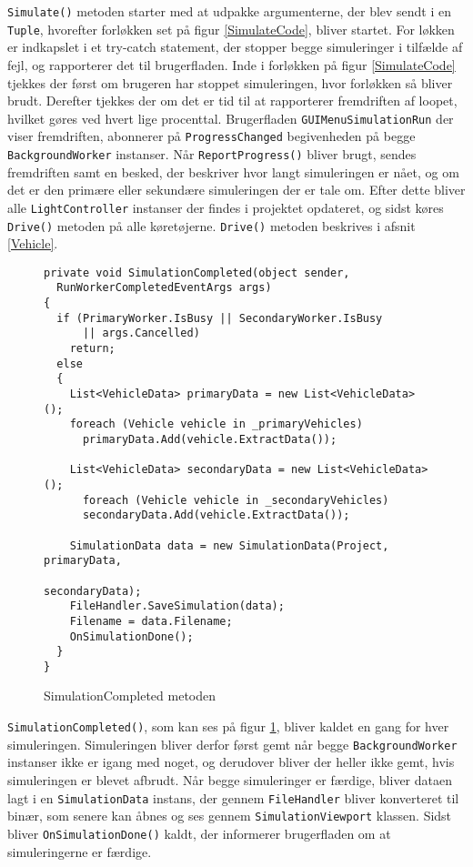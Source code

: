 \texttt{Simulate()} metoden starter med at udpakke argumenterne, der blev sendt i en \texttt{Tuple}, hvorefter forløkken set på figur \ref{SimulateCode}, bliver startet. For løkken er indkapslet i et try-catch statement, der stopper begge simuleringer i tilfælde af fejl, og rapporterer det til brugerfladen. Inde i forløkken på figur \ref{SimulateCode} tjekkes der først om brugeren har stoppet simuleringen, hvor forløkken så bliver brudt. Derefter tjekkes der om det er tid til at rapporterer fremdriften af loopet, hvilket gøres ved hvert lige procenttal. Brugerfladen \texttt{GUIMenuSimulationRun} der viser fremdriften, abonnerer på \texttt{ProgressChanged} begivenheden på begge \newline \texttt{BackgroundWorker} instanser. Når \texttt{ReportProgress()} bliver brugt, sendes fremdriften samt en besked, der beskriver hvor langt simuleringen er nået, og om det er den primære eller sekundære simuleringen der er tale om. Efter dette bliver alle \texttt{LightController} instanser der findes i projektet opdateret, og sidst køres \texttt{Drive()} metoden på alle køretøjerne. \texttt{Drive()} metoden beskrives i afsnit \ref{Vehicle}.

\begin{figure}[H]
\begin{lstlisting}
private void SimulationCompleted(object sender, 
  RunWorkerCompletedEventArgs args)
{
  if (PrimaryWorker.IsBusy || SecondaryWorker.IsBusy 
      || args.Cancelled)
    return;
  else
  {
    List<VehicleData> primaryData = new List<VehicleData>();
    foreach (Vehicle vehicle in _primaryVehicles)
      primaryData.Add(vehicle.ExtractData());

    List<VehicleData> secondaryData = new List<VehicleData>();
      foreach (Vehicle vehicle in _secondaryVehicles)
      secondaryData.Add(vehicle.ExtractData());

    SimulationData data = new SimulationData(Project, primaryData, 
                                             secondaryData);
    FileHandler.SaveSimulation(data);
    Filename = data.Filename;
    OnSimulationDone();
  }
}
\end{lstlisting}
\caption{SimulationCompleted metoden}\label{SimulationCompletedCode}
\end{figure}

\texttt{SimulationCompleted()}, som kan ses på figur \ref{SimulationCompletedCode}, bliver kaldet en gang for hver simuleringen. Simuleringen bliver derfor først gemt når begge \texttt{BackgroundWorker} instanser ikke er igang med noget, og derudover bliver der heller ikke gemt, hvis simuleringen er blevet afbrudt. Når begge simuleringer er færdige, bliver dataen lagt i en \texttt{SimulationData} instans, der gennem \texttt{FileHandler} bliver konverteret til binær, som senere kan åbnes og ses gennem \texttt{SimulationViewport} klassen. Sidst bliver \texttt{OnSimulationDone()} kaldt, der informerer brugerfladen om at simuleringerne er færdige.